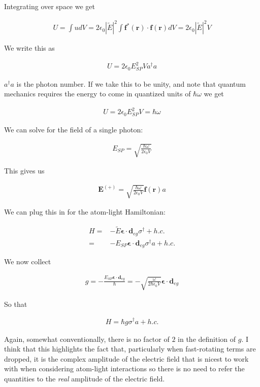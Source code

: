 \documentclass[12pt]{article}
\newcommand{\ep}{\epsilon}
\renewcommand{\vec}[1]{\boldsymbol{#1}}
\begin{document}
Integrating over space we get

\begin{align}
U = \int u dV = 2\ep_0 |\tilde{E}|^2 \int \vec{f}^*(\vec{r})\cdot \vec{f}(\vec{r}) dV = 2\ep_0 |\tilde{E}|^2 V
\end{align}

We write this as

\begin{align}
U = 2\ep_0 E_{SP}^2 V a^{\dag}a
\end{align}

$a^{\dag}a$ is the photon number.
If we take this to be unity, and note that quantum mechanics requires the energy to come in quantized units of $\hbar \omega$ we get

\begin{align}
U = 2\ep_0 E_{SP}^2 V = \hbar \omega
\end{align}

We can solve for the field of a single photon:

\begin{align}
E_{SP} = \sqrt{\frac{\hbar \omega}{2\ep_0 V}}
\end{align}

This gives us

\begin{align}
\vec{E}^{(+)} = \sqrt{\frac{\hbar \omega}{2\ep_0 V}} \vec{f}(\vec{r})a
\end{align}

We can plug this in for the atom-light Hamiltonian:

\begin{align}
H =& -\tilde{E} \vec{\ep}\cdot\vec{d}_{eg}\sigma^{\dag} + h.c.\\
=& - E_{SP} \vec{\ep}\cdot\vec{d}_{eg} \sigma^{\dag}a + h.c.
\end{align}

We now collect

\begin{align}
g = -\frac{E_{SP} \vec{\ep}\cdot\vec{d}_{eg}}{\hbar} = -\sqrt{\frac{\omega}{2\hbar \ep_0 V}} \vec{\ep}\cdot\vec{d}_{eg}
\end{align}

So that

\begin{align}
H = \hbar g\sigma^{\dag}a + h.c.
\end{align}

Again, somewhat conventionally, there is no factor of $2$ in the definition of $g$.
I think that this highlights the fact that, particularly when fast-rotating terms are dropped, it is the complex amplitude of the electric field that is nicest to work with when considering atom-light interactions so there is no need to refer the quantities to the \textit{real} amplitude of the electric field.
\end{document}

